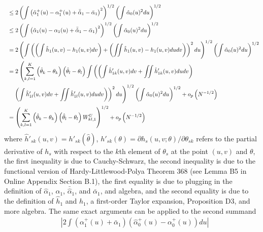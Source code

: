 \documentclass[12pt]{article}
\theoremstyle{definition}
\begin{document}
{\begin{align*}
&\hspace{2mm}\leq 2\left(\int \left(\hat{\alpha}_1^{+}(u) - \alpha_1^{+}(u) + \bar{\hat{\alpha}}_1 - \bar{\alpha}_1 \right)^2\right)^{1/2}\left(\int \hat{\alpha}_0(u)^{2}du\right)^{1/2} \\
&\hspace{2mm} \leq 2\left(\int \left(\hat{\alpha}_1(u) - \alpha_1(u) + \bar{\hat{\alpha}}_1 - \bar{\alpha}_1 \right)^2\right)^{1/2}\left(\int \hat{\alpha}_0(u)^{2}du\right)^{1/2} \\
&\hspace{2mm} = 2\left( \int\left(\left(\int \hat{h}_1(u,v) - h_1(u,v)dv\right) + \left(\iint \hat{h}_1(u,v) - h_1(u,v)dudv\right)\right)^2du\right)^{1/2}\left(\int \hat{\alpha}_0(u)^{2}du\right)^{1/2} \\
&\hspace{2mm}  =  2\left(\sum_{k,l=1}^{K}\left(\hat{
\theta}_{k}-\theta_{k}\right)\left(\hat{\theta}_{l}-\theta_{l}\right)\int \left(\left(\int \hat{h}'_{1k}(u,v)dv + \iint \hat{h}'_{1k}(u,v)dudv\right)\right.\right. \\
&\hspace{5mm}\left.\left.\left( \int  \hat{h}'_{1l}(u,v)dv + \iint \hat{h}'_{1l}(u,v)dudv\right)\right)^2du\right)^{1/2} \left(\int \hat{\alpha}_0(u)^{2}du\right)^{1/2} + o_{p}\left( N^{-1/2}\right) \\
&\hspace{2mm}  = \left(\sum_{k,l=1}^{K} \left(\hat{\theta}_{k} - \theta_{k}\right)\left(\hat{\theta}_{l} - \theta_{l}\right)W^{U}_{kl,1}\right)^{1/2}  + o_{p}\left( N^{-1/2}\right)
\end{align*}
where $\hat{h}'_{s k}(u,v)= h'_{s k}(\hat{\theta})$, $h'_{sk}(\theta) = \partial h_{s}(u,v;\theta)/\partial \theta_{sk}$ refers to the partial derivative of $h_s$ with respect to the $k$th element of $\theta_{s}$ at the point $(u,v)$ and $\theta$, the first inequality is due to Cauchy-Schwarz, the second inequality is due to the functional version of Hardy-Littlewood-Polya Theorem 368 (see Lemma B5 in Online Appendix Section B.1), the first equality is due to plugging in the definition of $\hat{\alpha}_1$, $\alpha_1$, $\bar{\hat{\alpha}}_1$, and $\bar{\alpha}_1$, and algebra, and the second equality is due to the definition of $\hat{h}_1$ and $h_1$, a first-order Taylor expansion, Proposition D3, and more algebra. The same exact arguments can be applied to the second summand  
\begin{align*}
&\left|2\int\left(\alpha_1^{+}(u) + \bar{\alpha}_1 \right)\left( \hat{\alpha}_0^{+}(u) -  \alpha_0^{+}(u)\right)du\right| \\

\end{align*}}
\end{document}
